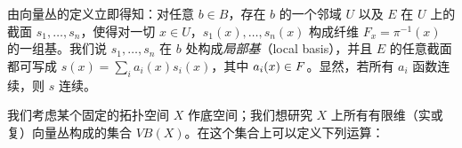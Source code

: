 
由向量丛的定义立即得知：对任意 $b\in B$，存在 $b$ 的一个邻域 $U$ 以及 $E$ 在 $U$ 上的截面 $s_1,\dots,s_n$，使得对一切 $x\in U$，$s_1(x),\dots,s_n(x)$ 构成纤维 $F_x=\pi^{-1}(x)$ 的一组基。我们说 $s_1,\dots,s_n$ 在 $b$ 处构成\emph{局部基}（local basis），并且 $E$ 的任意截面都可写成 $s(x)=\sum_i a_i(x)s_i(x)$，其中 $a_i(x)\in F$。显然，若所有 $a_i$ 函数连续，则 $s$ 连续。


我们考虑某个固定的拓扑空间 $X$ 作底空间；我们想研究 $X$ 上所有有限维（实或复）向量丛构成的集合 $VB(X)$。在这个集合上可以定义下列运算：

